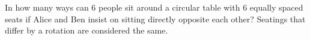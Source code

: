 In how many ways can $6$ people sit around a circular table with $6$ equally spaced seats if Alice and Ben insist on sitting directly opposite each other? Seatings that differ by a rotation are considered the same.
